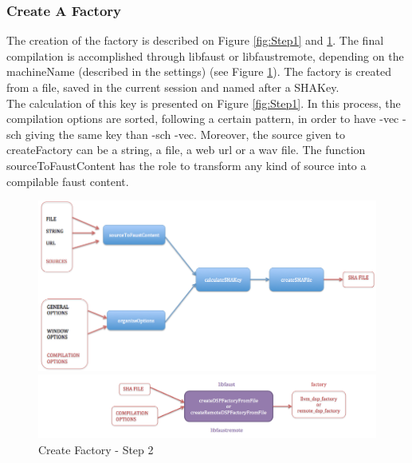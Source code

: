 \documentclass[a4paper]{article}
\begin{document}
\subsubsection{Create A Factory}

The creation of the factory is described on Figure \ref{fig:Step1} and \ref{fig:Step2}. The final compilation is accomplished through libfaust or libfaustremote, depending on the machineName (described in the settings) (see Figure  \ref{fig:Step2}). The factory is created from a file, saved in the current session and named after a SHAKey. \\

The calculation of this key is presented on Figure  \ref{fig:Step1}. In this process, the compilation options are sorted, following a certain pattern, in order to have -vec -sch giving the same key than -sch -vec. Moreover, the source given to createFactory can be a string, a file, a web url or a wav file. The function sourceToFaustContent has the role to transform any kind of source into a compilable faust content. 

\begin{figure}[!h]
\begin{center}
\includegraphics[width=\columnwidth]{images/Step1_Compilation.png}
\caption{Create Factory - Step 1}
\label{fig:Step1}
\vspace{0.5cm}
\includegraphics[width=\columnwidth]{images/Step2_Compilation.png}
\caption{Create Factory - Step 2}
\label{fig:Step2}
\end{center}
\end{figure}
\end{document}
